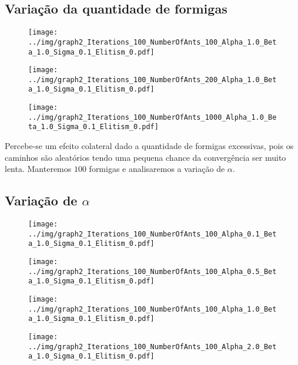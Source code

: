 \subsection*{Variação da quantidade de formigas}

\begin{figure}[H]
  \centering
  \texttt{[image: ../img/graph2\_Iterations\_100\_NumberOfAnts\_100\_Alpha\_1.0\_Beta\_1.0\_Sigma\_0.1\_Elitism\_0.pdf]}
\end{figure}

\begin{figure}[H]
  \centering
  \texttt{[image: ../img/graph2\_Iterations\_100\_NumberOfAnts\_200\_Alpha\_1.0\_Beta\_1.0\_Sigma\_0.1\_Elitism\_0.pdf]}
\end{figure}

\begin{figure}[H]
  \centering
  \texttt{[image: ../img/graph2\_Iterations\_100\_NumberOfAnts\_1000\_Alpha\_1.0\_Beta\_1.0\_Sigma\_0.1\_Elitism\_0.pdf]}
\end{figure}

Percebe-se um efeito colateral dado a quantidade de formigas excessivas, pois os caminhos são aleatórios tendo uma pequena chance
da convergência ser muito lenta. Manteremos $100$ formigas e analisaremos a variação de $\alpha$.

\subsection*{Variação de $\alpha$}

\begin{figure}[H]
  \centering
  \texttt{[image: ../img/graph2\_Iterations\_100\_NumberOfAnts\_100\_Alpha\_0.1\_Beta\_1.0\_Sigma\_0.1\_Elitism\_0.pdf]}
\end{figure}

\begin{figure}[H]
  \centering
  \texttt{[image: ../img/graph2\_Iterations\_100\_NumberOfAnts\_100\_Alpha\_0.5\_Beta\_1.0\_Sigma\_0.1\_Elitism\_0.pdf]}
\end{figure}

\begin{figure}[H]
  \centering
  \texttt{[image: ../img/graph2\_Iterations\_100\_NumberOfAnts\_100\_Alpha\_1.0\_Beta\_1.0\_Sigma\_0.1\_Elitism\_0.pdf]}
\end{figure}

\begin{figure}[H]
  \centering
  \texttt{[image: ../img/graph2\_Iterations\_100\_NumberOfAnts\_100\_Alpha\_2.0\_Beta\_1.0\_Sigma\_0.1\_Elitism\_0.pdf]}
\end{figure}

